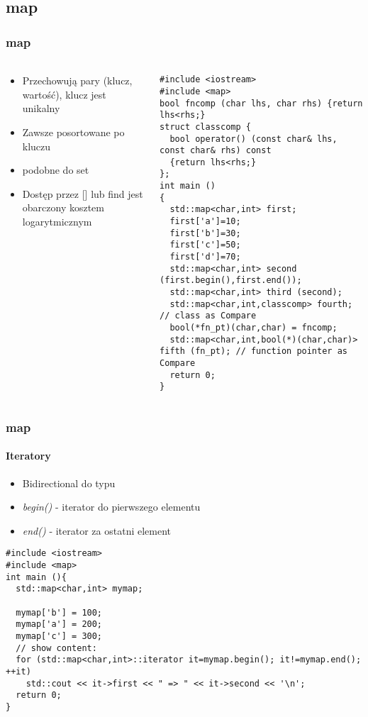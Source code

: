 \documentclass[10pt]{beamer}
\begin{document}
\subsection{map}

\begin{frame}[fragile]
  \frametitle{map}
  \framesubtitle{}
  \begin{columns}
    \begin{column}{0.4\textwidth}
    \begin{itemize}
      \item Przechowują pary (klucz, wartość), klucz jest unikalny
      \item Zawsze posortowane po kluczu
      \item podobne do set
      \item Dostęp przez [] lub find jest obarczony kosztem logarytmicznym
    \end{itemize}
    \end{column}
    \begin{column}{0.7\textwidth}
\begin{lstlisting}
#include <iostream>
#include <map>
bool fncomp (char lhs, char rhs) {return lhs<rhs;}
struct classcomp {
  bool operator() (const char& lhs, const char& rhs) const
  {return lhs<rhs;}
};
int main ()
{
  std::map<char,int> first;
  first['a']=10;
  first['b']=30;
  first['c']=50;
  first['d']=70;
  std::map<char,int> second (first.begin(),first.end());
  std::map<char,int> third (second);
  std::map<char,int,classcomp> fourth;                 // class as Compare
  bool(*fn_pt)(char,char) = fncomp;
  std::map<char,int,bool(*)(char,char)> fifth (fn_pt); // function pointer as Compare
  return 0;
}
\end{lstlisting}
    \end{column}
  \end{columns}
\end{frame}

\begin{frame}[fragile]
  \frametitle{map}
  \framesubtitle{Iteratory}
  \begin{itemize}
    \item Bidirectional do typu
    \item \textit{begin()} - iterator do pierwszego elementu
    \item \textit{end()} - iterator za ostatni element
  \end{itemize}
  \begin{lstlisting}
#include <iostream>
#include <map>
int main (){
  std::map<char,int> mymap;

  mymap['b'] = 100;
  mymap['a'] = 200;
  mymap['c'] = 300;
  // show content:
  for (std::map<char,int>::iterator it=mymap.begin(); it!=mymap.end(); ++it)
    std::cout << it->first << " => " << it->second << '\n';
  return 0;
}
\end{lstlisting}
\end{frame}
\end{document}
